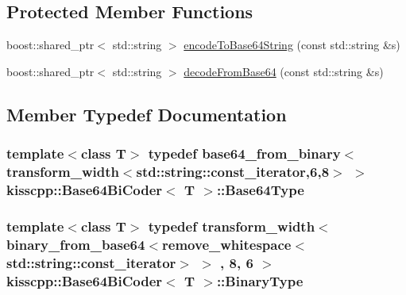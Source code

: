 \subsection*{Protected Member Functions}
\begin{DoxyCompactItemize}
\item 
boost\-::shared\-\_\-ptr$<$ std\-::string $>$ \hyperlink{classkisscpp_1_1_base64_bi_coder_ab17cf7f1594fa761eca93d6a1ee614ef}{encode\-To\-Base64\-String} (const std\-::string \&s)
\item 
boost\-::shared\-\_\-ptr$<$ std\-::string $>$ \hyperlink{classkisscpp_1_1_base64_bi_coder_af8b91f925c229a0892be4e5d9428fb13}{decode\-From\-Base64} (const std\-::string \&s)
\end{DoxyCompactItemize}


\subsection{Member Typedef Documentation}
\hypertarget{classkisscpp_1_1_base64_bi_coder_a54d2f4ba00e068e8d4d6fd6497ebf21d}{
\subsubsection[{Base64\-Type}]{\setlength{\rightskip}{0pt plus 5cm}template$<$class T$>$ typedef base64\-\_\-from\-\_\-binary$<$transform\-\_\-width$<$std\-::string\-::const\-\_\-iterator,6,8$>$ $>$ {\bf kisscpp\-::\-Base64\-Bi\-Coder}$<$ T $>$\-::{\bf Base64\-Type}}}\label{classkisscpp_1_1_base64_bi_coder_a54d2f4ba00e068e8d4d6fd6497ebf21d}
\hypertarget{classkisscpp_1_1_base64_bi_coder_a3d4011fcafbdf230c7cc8188714ed499}{
\subsubsection[{Binary\-Type}]{\setlength{\rightskip}{0pt plus 5cm}template$<$class T$>$ typedef transform\-\_\-width$<$ binary\-\_\-from\-\_\-base64$<$remove\-\_\-whitespace$<$std\-::string\-::const\-\_\-iterator$>$ $>$ , 8, 6 $>$ {\bf kisscpp\-::\-Base64\-Bi\-Coder}$<$ T $>$\-::{\bf Binary\-Type}}}\label{classkisscpp_1_1_base64_bi_coder_a3d4011fcafbdf230c7cc8188714ed499}


